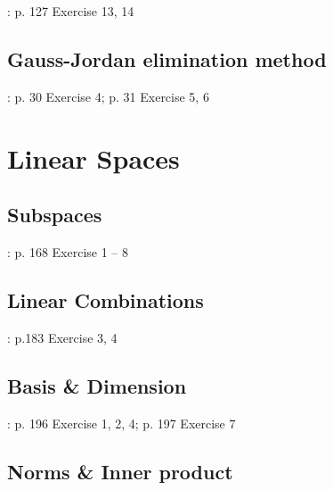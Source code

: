 \documentclass[12pt]{article}
\begin{document}
\cite{Shores}: p. 127 Exercise 13, 14

\subsection{Gauss-Jordan elimination method}

\cite{Shores}: p. 30 Exercise 4; p. 31 Exercise 5, 6

\section{Linear Spaces}

\subsection{Subspaces}

\cite{Shores}: p. 168 Exercise  1 -- 8

\subsection{Linear Combinations}

\cite{Shores}: p.183 Exercise 3, 4

\subsection{Basis \& Dimension}

\cite{Shores}: p. 196 Exercise 1, 2, 4; p. 197 Exercise 7

\subsection{Norms \& Inner product}
\end{document}
